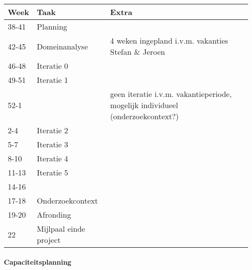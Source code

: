 \begin{tabular}{lll}\hline
{\bf Week}    & {\bf Taak}  & {\bf Extra}\\\hline
38-41         & Planning    \\
42-45         & Domeinanalyse & 4 weken ingepland i.v.m. vakanties Stefan \& Jeroen \\
46-48         & Iteratie 0    \\
49-51         & Iteratie 1    \\
52-1          &               & geen iteratie i.v.m. vakantieperiode, mogelijk individueel (onderzoekcontext?) \\
2-4           & Iteratie 2    \\
5-7           & Iteratie 3    \\
8-10          & Iteratie 4    \\
11-13         & Iteratie 5    \\
14-16         &               \\
17-18         & Onderzoekcontext \\
19-20         & Afronding     \\
22            & Mijlpaal einde project

\end{tabular}




\paragraph{Capaciteitsplanning}

